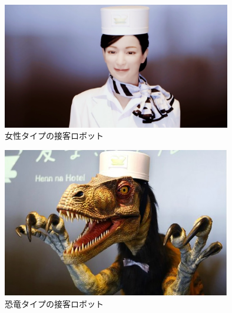 \documentclass[12pt,oneside]{sotsuken_paper}
\begin{document}
\begin{figure}[htbp]
\begin{center}
\includegraphics[width=100mm]{img/huistenbosch_human.png}
\caption{女性タイプの接客ロボット}
\label{fig:huistenbosch_human}
\end{center}
\end{figure}


\begin{figure}[htbp]
\begin{center}
\includegraphics[width=100mm]{img/huistenbosch_dinosaur.jpg}
\caption{恐竜タイプの接客ロボット}
\label{fig:huistenbosch_dinosaur}
\end{center}
\end{figure}
\end{document}
